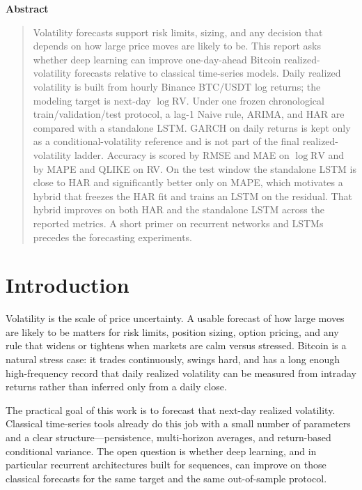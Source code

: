 \documentclass[12pt]{article}
\begin{document}
\thispagestyle{empty}
\begin{center}
{\Large\bfseries Abstract}
\end{center}
\vspace{1.25em}
\begin{quote}
\noindent
Volatility forecasts support risk limits, sizing, and any decision that depends on how large price moves are likely to be.
This report asks whether deep learning can improve one-day-ahead Bitcoin realized-volatility forecasts relative to classical time-series models.
Daily realized volatility is built from hourly Binance BTC/USDT log returns; the modeling target is next-day \(\log\mathrm{RV}\).
Under one frozen chronological train/validation/test protocol, a lag-1 Naive rule, ARIMA, and HAR are compared with a standalone LSTM.
GARCH on daily returns is kept only as a conditional-volatility reference and is not part of the final realized-volatility ladder.
Accuracy is scored by RMSE and MAE on \(\log\mathrm{RV}\) and by MAPE and QLIKE on RV.
On the test window the standalone LSTM is close to HAR and significantly better only on MAPE, which motivates a hybrid that freezes the HAR fit and trains an LSTM on the residual.
That hybrid improves on both HAR and the standalone LSTM across the reported metrics.
A short primer on recurrent networks and LSTMs precedes the forecasting experiments.
\end{quote}
\clearpage

\tableofcontents
\clearpage

\section{Introduction}
Volatility is the scale of price uncertainty. A usable forecast of how large moves are likely to be matters for risk limits, position sizing, option pricing, and any rule that widens or tightens when markets are calm versus stressed.
Bitcoin is a natural stress case: it trades continuously, swings hard, and has a long enough high-frequency record that daily realized volatility can be measured from intraday returns rather than inferred only from a daily close.

The practical goal of this work is to forecast that next-day realized volatility.
Classical time-series tools already do this job with a small number of parameters and a clear structure---persistence, multi-horizon averages, and return-based conditional variance.
The open question is whether deep learning, and in particular recurrent architectures built for sequences, can improve on those classical forecasts for the same target and the same out-of-sample protocol.
\end{document}
